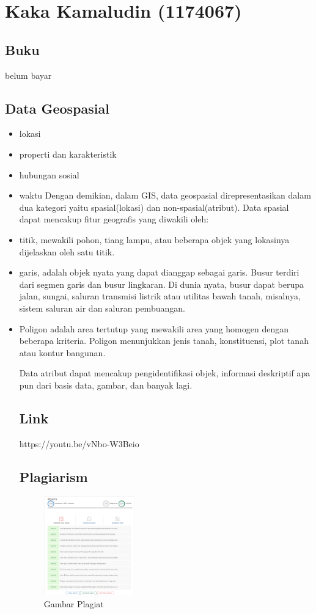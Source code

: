 \section{Kaka Kamaludin (1174067)}
\subsection{Buku}
belum bayar
\subsection{Data Geospasial}
\begin{itemize}
Data geospasial (GD) adalah informasi yang entah bagaimana dilampirkan ke lokasi objek tertentu. Biasanya, informasi ini disimpan dalam bentuk koordinat geografis dan topologi. Jumlah data tersebut tumbuh pada tingkat yang mengejutkan, karena sebagian besar dibuat bukan oleh orang-orang, tetapi oleh berbagai perangkat.
	Data geografis berisi empat komponen terintegrasi:
	\item lokasi
	\item properti dan karakteristik
	\item hubungan sosial
	\item waktu
Dengan demikian, dalam GIS, data geospasial direpresentasikan dalam dua kategori yaitu spasial(lokasi) dan non-spasial(atribut). Data spasial dapat mencakup fitur geografis yang diwakili oleh:
 	\item titik, mewakili pohon, tiang lampu, atau beberapa objek yang lokasinya dijelaskan oleh satu titik.
 	\item garis,  adalah objek nyata yang dapat dianggap sebagai garis. Busur terdiri dari segmen garis dan busur lingkaran. Di dunia nyata, busur dapat berupa jalan, sungai, saluran transmisi listrik atau utilitas bawah tanah, misalnya, sistem saluran air dan saluran pembuangan.
 	\item Poligon adalah area tertutup yang mewakili area yang homogen dengan beberapa kriteria. Poligon menunjukkan jenis tanah, konstituensi, plot tanah atau kontur bangunan.
 
Data atribut dapat mencakup pengidentifikasi objek, informasi deskriptif apa pun dari basis data, gambar, dan banyak lagi.
\subsection{Link}
https://youtu.be/vNbo-W3Beio
\subsection{Plagiarism}
\begin{figure}[H]
	\includegraphics[width=4cm]{figures/Tugas1/1174067/plagiat.png}
	\centering
	\caption{Gambar Plagiat}

\end{figure}
\end{itemize}
